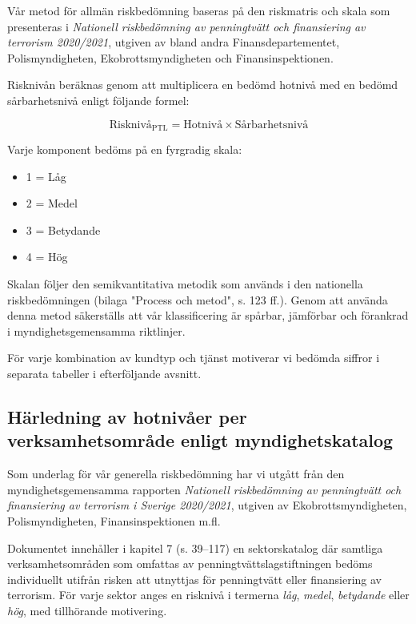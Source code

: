 \documentclass{article}
\begin{document}
Vår metod för allmän riskbedömning baseras på den riskmatris och skala som presenteras i \textit{Nationell riskbedömning av penningtvätt och finansiering av terrorism 2020/2021}, utgiven av bland andra Finansdepartementet, Polismyndigheten, Ekobrottsmyndigheten och Finansinspektionen.

Risknivån beräknas genom att multiplicera en bedömd hotnivå med en bedömd sårbarhetsnivå enligt följande formel:

\[
\text{Risknivå}_{\text{PTL}} = \text{Hotnivå} \times \text{Sårbarhetsnivå}
\]

Varje komponent bedöms på en fyrgradig skala:

\begin{itemize}[label=--]
  \item 1 = Låg
  \item 2 = Medel
  \item 3 = Betydande
  \item 4 = Hög
\end{itemize}

\noindent Skalan följer den semikvantitativa metodik som används i den nationella riskbedömningen (bilaga "Process och metod", s. 123 ff.). Genom att använda denna metod säkerställs att vår klassificering är spårbar, jämförbar och förankrad i myndighetsgemensamma riktlinjer.

För varje kombination av kundtyp och tjänst motiverar vi bedömda siffror i separata tabeller i efterföljande avsnitt.

\vspace{3em}

\subsection*{Härledning av hotnivåer per verksamhetsområde enligt myndighetskatalog}

Som underlag för vår generella riskbedömning har vi utgått från den myndighetsgemensamma rapporten \textit{Nationell riskbedömning av penningtvätt och finansiering av terrorism i Sverige 2020/2021}, utgiven av Ekobrottsmyndigheten, Polismyndigheten, Finansinspektionen m.fl.

Dokumentet innehåller i kapitel 7 (s. 39–117) en sektorskatalog där samtliga verksamhetsområden som omfattas av penningtvättslagstiftningen bedöms individuellt utifrån risken att utnyttjas för penningtvätt eller finansiering av terrorism. För varje sektor anges en risknivå i termerna \textit{låg}, \textit{medel}, \textit{betydande} eller \textit{hög}, med tillhörande motivering.
\end{document}
